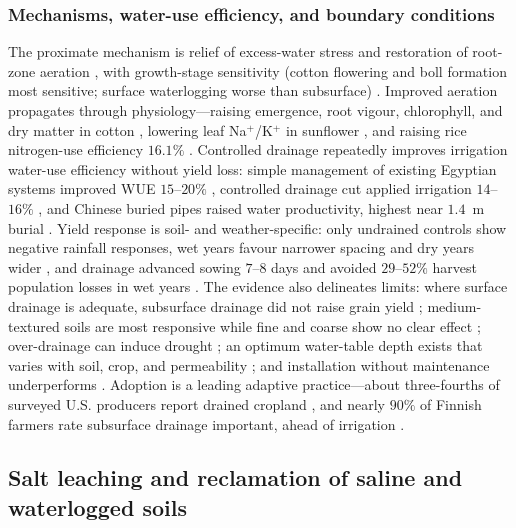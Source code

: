\documentclass[11pt]{article}
\begin{document}
\subsubsection{Mechanisms, water-use efficiency, and boundary conditions}

The proximate mechanism is relief of excess-water stress and restoration of
root-zone aeration \parencite{BENNETT1982,DarziNaftchali2014}, with growth-stage
sensitivity (cotton flowering and boll formation most sensitive; surface
waterlogging worse than subsurface) \parencite{Qian2021}. Improved aeration
propagates through physiology---raising emergence, root vigour, chlorophyll, and
dry matter in cotton \parencite{Yang2022}, lowering leaf Na$^+$/K$^+$ in
sunflower \parencite{Islam2022}, and raising rice nitrogen-use efficiency
$16.1\%$ \parencite{DarziNaftchali2022b}. Controlled drainage repeatedly
improves irrigation water-use efficiency without yield loss: simple management
of existing Egyptian systems improved WUE $15$--$20\%$ \parencite{Wahba2005},
controlled drainage cut applied irrigation $14$--$16\%$ \parencite{Mahmoud2021},
and Chinese buried pipes raised water productivity, highest near $1.4$~m burial
\parencite{Liu2025}. Yield response is soil- and weather-specific: only
undrained controls show negative rainfall responses, wet years favour narrower
spacing and dry years wider \parencite{Rui2024,Kladivko2005,Acharya2019}, and
drainage advanced sowing $7$--$8$ days and avoided $29$--$52\%$ harvest
population losses in wet years \parencite{Mourtzinis2021,Nelson2011}. The
evidence also delineates limits: where surface drainage is adequate, subsurface
drainage did not raise grain yield \parencite{Wiersma2010}; medium-textured
soils are most responsive while fine and coarse show no clear effect
\parencite{Singh2022b}; over-drainage can induce drought
\parencite{Cordeiro2015,DeBoer2006}; an optimum water-table depth exists that
varies with soil, crop, and permeability \parencite{HOOGHOUDT1952,Bigelow2001};
and installation without maintenance underperforms \parencite{Malota2016}.
Adoption is a leading adaptive practice---about three-fourths of surveyed U.S.
producers report drained cropland \parencite{Morton2015}, and nearly $90\%$ of
Finnish farmers rate subsurface drainage important, ahead of irrigation
\parencite{PeltonenSainio2021}.

\subsection{Salt leaching and reclamation of saline and waterlogged soils}
\end{document}
